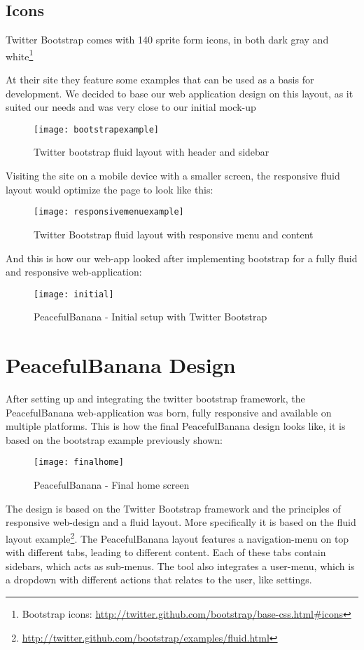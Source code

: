 \subsection{Icons}
Twitter Bootstrap comes with 140 sprite form icons, in both dark gray and white\footnote{Bootstrap icons: \url{http://twitter.github.com/bootstrap/base-css.html\#icons}} 

\newpage
At their site they feature some examples that can be used as a basis for development. We decided to base our web application design on this layout, as it suited our needs and was very close to our initial mock-up
\begin{figure}[h!]
\centering
	\texttt{[image: bootstrapexample]}
\caption{Twitter bootstrap fluid layout with header and sidebar}
\label{bootstrapexample}
\end{figure}

Visiting the site on a mobile device with a smaller screen, the responsive fluid layout would optimize the page to look like this:
\begin{figure}[h!]
\centering
	\texttt{[image: responsivemenuexample]}
\caption{Twitter Bootstrap fluid layout with responsive menu and content}
\label{bootstrapresponsive}
\end{figure}
\newpage
And this is how our web-app looked after implementing bootstrap for a fully fluid and responsive web-application:
\begin{figure}[h!]
\centering
	\texttt{[image: initial]}
\caption{PeacefulBanana - Initial setup with Twitter Bootstrap}
\label{teamscreen}
\end{figure}

\section{PeacefulBanana Design}
After setting up and integrating the twitter bootstrap framework, the PeacefulBanana web-application was born, fully responsive and available on multiple platforms. This is how the final PeacefulBanana design looks like, it is based on the bootstrap example previously shown:
\begin{figure}[h!]
\centering
	\texttt{[image: finalhome]}
\caption{PeacefulBanana - Final home screen}
\label{finalhome}
\end{figure}
The design is based on the Twitter Bootstrap framework and the principles of responsive web-design and a fluid layout. More specifically it is based on the fluid layout example\footnote{\url{http://twitter.github.com/bootstrap/examples/fluid.html}}. The PeacefulBanana layout features a navigation-menu on top with different tabs, leading to different content. Each of these tabs contain sidebars, which acts as sub-menus. The tool also integrates a user-menu, which is a dropdown with different actions that relates to the user, like settings. 

